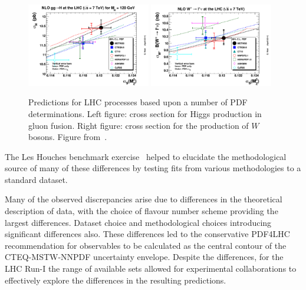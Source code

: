 \begin{figure}[ht]
\centering
\includegraphics[width=0.48\textwidth]{3-PDFdet/figs/ggH120GeVLHC7TeVnlo68cl.pdf}
\includegraphics[width=0.48\textwidth]{3-PDFdet/figs/wpmLHC7TeVnlo68cl.pdf}
\caption[Predictions for example LHC processes based upon a number of PDF determinations]{Predictions for LHC processes based upon a number of PDF determinations. Left figure: cross section for Higgs production in gluon fusion. Right figure: cross section for the production of $W$ bosons. Figure from~\cite{Watt:2011kp}.}
\label{fig:standardcandleerror}
\end{figure}
The Les Houches benchmark exercise~\cite{Dittmar:2009ii} helped to elucidate the methodological source of many of these differences by testing fits from various methodologies to a standard dataset.

Many of the observed discrepancies arise due to differences in the theoretical description of data, with the choice of flavour number scheme providing the largest differences. Dataset choice and methodological choices introducing significant differences also. These differences led to the conservative PDF4LHC recommendation for observables to be calculated as the central contour of the CTEQ-MSTW-NNPDF uncertainty envelope. Despite the differences, for the LHC Run-I the range of available sets allowed for experimental collaborations to effectively explore the differences in the resulting predictions.

